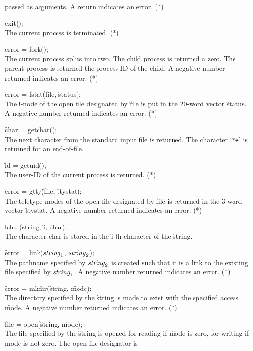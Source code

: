\documentclass[12pt]{report}
\begin{document}
\begin{description}
  passed as arguments. A return indicates an error. (*)
\item[]exit(); \hfill\\
  The current process is terminated. (*)
\item[]error = fork(); \hfill\\
  The current process splits into two. The child process is returned a
  zero. The parent process is returned the process ID of the child. A
  negative number returned indicates an error. (*)
\item[]\f{error} = fstat(\f{file}, \f{status}); \hfill\\
  The i-node of the open file designated by \f{file} is put in the 20-word
  vector \f{status}. A negative number returned indicates an error. (*)
\item[]\f{char} = getchar();\hfill\\
  The next character from the standard input file is returned. The
  character `\verb|*e|' is returned for an end-of-file.
\item[]\f{id} = getuid();\hfill\\
  The user-ID of the current process is returned. (*)
\item[]\f{error} = gtty(\f{file}, \f{ttystat});\hfill\\
  The teletype modes of the open file designated by \f{file} is returned
  in the 3-word vector \f{ttystat}. A negative number returned indicates an
  error. (*)
\item[]lchar(\f{string}, \f{i}, \f{char}); \hfill\\
  The character \f{char} is stored in the \f{i}-th character of the \f{string}.
\item[]\f{error} = link($\mathit{string}_1$, $\mathit{string}_2$); \hfill\\
  The pathname specified by $\mathit{string}_2$ is created such that it is a link
  to the existing file specified by $\mathit{string}_1$. A negative number
  returned indicates an error. (*)
\item[]\f{error} = mkdir(\f{string}, \f{mode}); \hfill\\
  The directory specified by the \f{string} is made to exist with the
  specified access \f{mode}. A negative number returned indicates an
  error. (*)
\item[]\f{file} = open(\f{string}, \f{mode}); \hfill\\
  The file specified by the \f{string} is opened for reading if \f{mode} is
  zero, for writing if mode is not zero. The open file designator is

\end{description}
\end{document}
